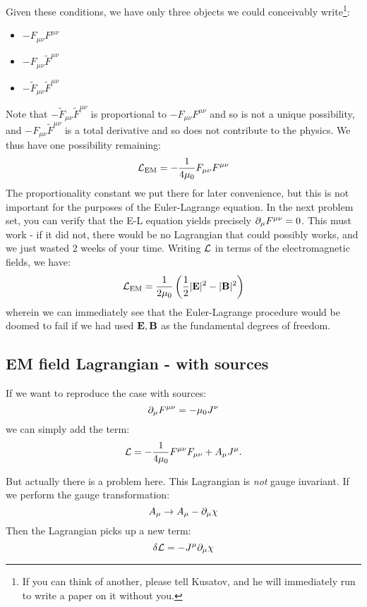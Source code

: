 Given these conditions, we have only three objects we could conceivably write\footnote{If you can think of another, please tell Kusatov, and he will immediately run to write a paper on it without you.}:
\begin{itemize}
    \item $-F_{\mu\nu}F^{\mu\nu}$
    \item $-F_{\mu\nu}\tilde{F}^{\mu\nu}$
    \item $-\tilde{F}_{\mu\nu}\tilde{F}^{\mu\nu}$
\end{itemize}
Note that $-\tilde{F}_{\mu\nu}\tilde{F}^{\mu\nu}$ is proportional to $-F_{\mu\nu}F^{\mu\nu}$ and so is not a unique possibility, and $-F_{\mu\nu}\tilde{F}^{\mu\nu}$ is a total derivative and so does not contribute to the physics. We thus have one possibility remaining:
\begin{equation}
    \mathcal{L}_{\text{EM}} = -\frac{1}{4\mu_0}F_{\mu\nu}F^{\mu\nu}
\end{equation}
The proportionality constant we put there for later convenience, but this is not important for the purposes of the Euler-Lagrange equation. In the next problem set, you can verify that the E-L equation yields precisely $\partial_{\mu}F^{\mu\nu} = 0$. This must work - if it did not, there would be no Lagrangian that could possibly works, and we just wasted 2 weeks of your time. Writing $\mathcal{L}$ in terms of the electromagnetic fields, we have:
\begin{equation}
    \mathcal{L}_{\text{EM}} = \frac{1}{2\mu_0}\left(\frac{1}{2}\lvert \mathbf{E} \rvert^2 - \lvert \mathbf{B} \rvert^2\right)
\end{equation}
wherein we can immediately see that the Euler-Lagrange procedure would be doomed to fail if we had used $\mathbf{E}, \mathbf{B}$ as the fundamental degrees of freedom.

\subsection{EM field Lagrangian - with sources}
If we want to reproduce the case with sources:
\begin{equation}
    \partial_{\mu}F^{\mu\nu} = -\mu_0 J^\nu
\end{equation}
we can simply add the term:
\begin{equation}
    \mathcal{L} = -\frac{1}{4\mu_0}F^{\mu\nu}F_{\mu\nu} + A_\mu J^\mu.
\end{equation}

But actually there is a problem here. This Lagrangian is \emph{not} gauge invariant. If we perform the gauge transformation:
\begin{equation}
    A_\mu \to A_\mu - \partial_\mu \chi
\end{equation}
Then the Lagrangian picks up a new term:
\begin{equation}
    \delta \mathcal{L} = -J^\mu \partial_\mu \chi
\end{equation}

